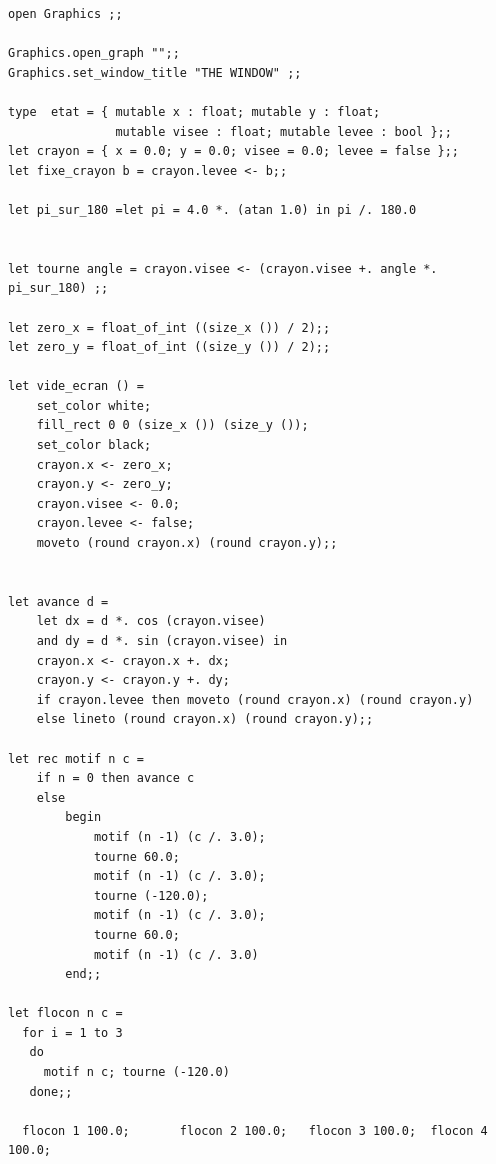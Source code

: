 \begin{Verbatim}
open Graphics ;;

Graphics.open_graph "";;
Graphics.set_window_title "THE WINDOW" ;;

type  etat = { mutable x : float; mutable y : float; 
               mutable visee : float; mutable levee : bool };;
let crayon = { x = 0.0; y = 0.0; visee = 0.0; levee = false };; 
let fixe_crayon b = crayon.levee <- b;;

let pi_sur_180 =let pi = 4.0 *. (atan 1.0) in pi /. 180.0 


let tourne angle = crayon.visee <- (crayon.visee +. angle *. pi_sur_180) ;;

let zero_x = float_of_int ((size_x ()) / 2);;
let zero_y = float_of_int ((size_y ()) / 2);;

let vide_ecran () =
	set_color white;
	fill_rect 0 0 (size_x ()) (size_y ());
	set_color black;
	crayon.x <- zero_x;
	crayon.y <- zero_y;
	crayon.visee <- 0.0;
	crayon.levee <- false;
	moveto (round crayon.x) (round crayon.y);;


let avance d =
	let dx = d *. cos (crayon.visee)
	and dy = d *. sin (crayon.visee) in
	crayon.x <- crayon.x +. dx;
	crayon.y <- crayon.y +. dy;
	if crayon.levee then moveto (round crayon.x) (round crayon.y)
	else lineto (round crayon.x) (round crayon.y);;

let rec motif n c =
	if n = 0 then avance c
	else
		begin
			motif (n -1) (c /. 3.0);
			tourne 60.0;
			motif (n -1) (c /. 3.0);
			tourne (-120.0);
			motif (n -1) (c /. 3.0);
			tourne 60.0;
			motif (n -1) (c /. 3.0)
		end;;

let flocon n c =
  for i = 1 to 3 
   do 
     motif n c; tourne (-120.0)
   done;;

  flocon 1 100.0;		flocon 2 100.0;	  flocon 3 100.0;  flocon 4 100.0;	
\end{Verbatim}

